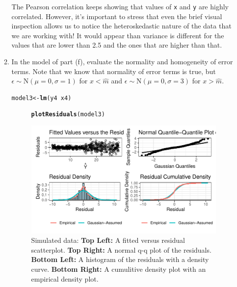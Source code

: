 \documentclass{article}\usepackage[]{graphicx}\usepackage[]{color}
\makeatletter
\def\maxwidth{ %
  \ifdim\Gin@nat@width>\linewidth
    \linewidth
  \else
    \Gin@nat@width
  \fi
}
\newcommand{\hlopt}[1]{\textcolor[rgb]{0,0,0}{#1}}%
\newcommand{\hlstd}[1]{\textcolor[rgb]{0.345,0.345,0.345}{#1}}%
\newcommand{\hlkwb}[1]{\textcolor[rgb]{0.69,0.353,0.396}{#1}}%
\newcommand{\hlkwd}[1]{\textcolor[rgb]{0.737,0.353,0.396}{\textbf{#1}}}%
\newenvironment{kframe}{%
 \def\at@end@of@kframe{}%
 \ifinner\ifhmode%
  \def\at@end@of@kframe{\end{minipage}}%
  \begin{minipage}{\columnwidth}%
 \fi\fi%
 \def\FrameCommand##1{\hskip\@totalleftmargin \hskip-\fboxsep
 \colorbox{shadecolor}{##1}\hskip-\fboxsep
     \hskip-\linewidth \hskip-\@totalleftmargin \hskip\columnwidth}%
 \MakeFramed {\advance\hsize-\width
   \@totalleftmargin\z@ \linewidth\hsize
   \@setminipage}}%
 {\par\unskip\endMakeFramed%
 \at@end@of@kframe}
\newenvironment{knitrout}{}{} %
\makeatother
\begin{document}
\begin{enumerate}
\begin{enumerate}
The Pearson correlation keeps showing that values of \texttt{x} and \texttt{y} are highly correlated. However, it's important to stress that even the brief visual inspection allows us to notice the heteroskedastic nature of the data that we are working with! It would appear than variance is different for the values that are lower than 2.5 and the ones that are higher than that. 

  \item In the model of part (f), evaluate the normality and homogeneity of error terms. Note
  that we know that normality of error terms is true, but $\epsilon \sim 
  \textrm{N}(\mu=0,\sigma=1)$ for $x<\widehat{m}$ and $\epsilon \sim 
  \textrm{N}(\mu=0,\sigma=3)$ for $x>\widehat{m}$.
\begin{knitrout}
\color{fgcolor}\begin{kframe}
\begin{alltt}
\hlstd{model3} \hlkwb{<-} \hlkwd{lm}\hlstd{(y4}\hlopt{~}\hlstd{x4)}
\end{alltt}
\end{kframe}
\end{knitrout}


\begin{figure}[H]
\begin{center}
\begin{knitrout}
\color{fgcolor}\begin{kframe}
\begin{alltt}
\hlkwd{plotResiduals}\hlstd{(model3)}
\end{alltt}
\end{kframe}
\includegraphics[width=\maxwidth]{figure/p3plot7-1} 
\end{knitrout}
\caption{Simulated data: \textbf{Top Left:} A fitted versus residual scatterplot.
\textbf{Top Right:} A normal q-q plot of the residuals. \textbf{Bottom Left:} A histogram of the residuals with a density curve. \textbf{Bottom Right:} A cumulitive density plot with an empirical density plot.}
\label{p3plot7}
\end{center}
\end{figure}
\end{enumerate}


\end{enumerate}
\end{document}
